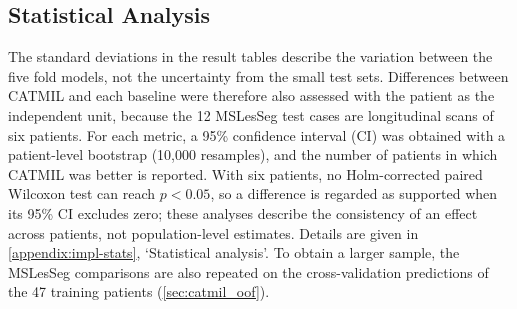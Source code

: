\subsection{Statistical Analysis}
\label{sec:stats}

The standard deviations in the result tables describe the variation
between the five fold models, not the uncertainty from the small test sets.
Differences between CATMIL and each baseline were therefore also assessed
with the patient as the independent unit, because the 12 MSLesSeg test
cases are longitudinal scans of six patients. For each metric, a
95\% confidence interval (CI) was obtained with a patient-level bootstrap
(10{,}000 resamples), and the number of patients in which CATMIL was better
is reported. With six patients, no Holm-corrected paired Wilcoxon test can
reach $p < 0.05$, so a difference is regarded as supported when its 95\%
CI excludes zero; these analyses describe the consistency of an effect
across patients, not population-level estimates. Details are given in
\cref{appendix:impl-stats}, `Statistical analysis'. To obtain a larger sample, the MSLesSeg comparisons
are also repeated on the cross-validation predictions of the 47 training
patients (\cref{sec:catmil_oof}).
